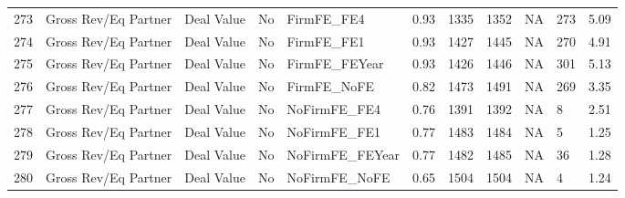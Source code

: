 \documentclass{article}
\begin{document}
\begin{table}[H]
\begin{tabular}{rllllllllll}
  273 & Gross Rev/Eq Partner & Deal Value & No & FirmFE\_FE4 & 0.93 & 1335 & 1352 & NA & 273 & 5.09 \\ 
  274 & Gross Rev/Eq Partner & Deal Value & No & FirmFE\_FE1 & 0.93 & 1427 & 1445 & NA & 270 & 4.91 \\ 
  275 & Gross Rev/Eq Partner & Deal Value & No & FirmFE\_FEYear & 0.93 & 1426 & 1446 & NA & 301 & 5.13 \\ 
  276 & Gross Rev/Eq Partner & Deal Value & No & FirmFE\_NoFE & 0.82 & 1473 & 1491 & NA & 269 & 3.35 \\ 
  277 & Gross Rev/Eq Partner & Deal Value & No & NoFirmFE\_FE4 & 0.76 & 1391 & 1392 & NA & 8 & 2.51 \\ 
  278 & Gross Rev/Eq Partner & Deal Value & No & NoFirmFE\_FE1 & 0.77 & 1483 & 1484 & NA & 5 & 1.25 \\ 
  279 & Gross Rev/Eq Partner & Deal Value & No & NoFirmFE\_FEYear & 0.77 & 1482 & 1485 & NA & 36 & 1.28 \\ 
  280 & Gross Rev/Eq Partner & Deal Value & No & NoFirmFE\_NoFE & 0.65 & 1504 & 1504 & NA & 4 & 1.24 \\ 
   \hline
\end{tabular}
\end{table}
\end{document}
